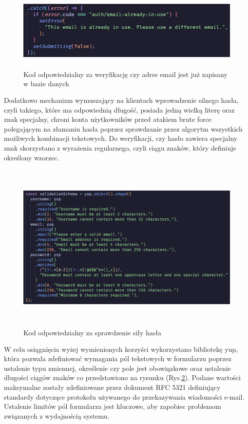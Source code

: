\begin{figure}[ht]
	\centering
	\vspace{0.25cm}
	\includegraphics[height=4cm]{images/bezpieczenstwo/auth_email}
	\caption{Kod odpowiedzialny za weryfikację czy adres email jest już zapisany w bazie danych}
	\label{fig:Auth}
\end{figure}

Dodatkowo mechanizm wymuszający na klientach wprowadzenie silnego hasła, czyli takiego, które ma odpowiednią długość, posiada jedną wielką literę oraz znak specjalny, chroni konta użytkowników przed atakiem brute force polegającym na złamaniu hasła poprzez sprawdzanie przez algorytm wszystkich możliwych kombinacji tekstowych. Do weryfikacji, czy hasło zawiera specjalny znak skorzystano z wyrażenia regularnego, czyli ciągu znaków, który definiuje określony wzorzec.

\begin{figure}[ht]
	\centering
	\vspace{0.25cm}
	\includegraphics[height=8.5cm]{images/bezpieczenstwo/validationSchema}
	\caption{Kod odpowiedzialny za sprawdzenie siły hasła}
	\label{fig:Validation}
\end{figure}

W celu osiągnięcia wyżej wymienionych korzyści wykorzystano bibliotekę yup, która pozwala zdefiniować wymagania pól tekstowych w formularzu poprzez ustalenie typu zmiennej, określenie czy pole jest obowiązkowe oraz ustalenie długości ciągów znaków co przedstawiono na rysunku (Rys.\ref{fig:Validation}). Podane wartości maksymalne zostały zdefiniowane przez dokument RFC 5321 \cite{rfc} definiujący standardy dotyczące protokołu używanego do przekazywania wiadomości e-mail. Ustalenie limitów pól formularza jest kluczowe, aby zapobiec problemom związanych z wydajnością systemu.

